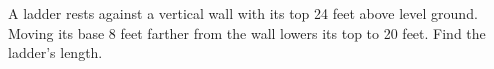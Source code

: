 A ladder rests against a vertical wall with its top 24 feet above level ground. Moving its base 8 feet farther from the wall lowers its top to 20 feet. Find the ladder's length.
